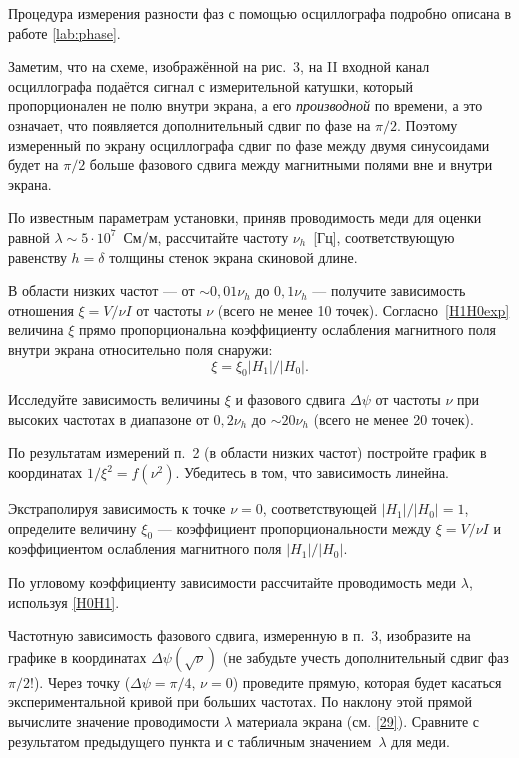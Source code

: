 Процедура измерения разности фаз с помощью осциллографа
подробно описана в работе \ref{lab:phase}.

Заметим, что на схеме, изображённой на рис.~3, на II входной канал
осциллографа подаётся сигнал с измерительной катушки, который пропорционален 
не полю внутри экрана, а его \emph{производной} по времени, а это означает, 
что появляется дополнительный сдвиг по фазе на $\pi/2$. Поэтому измеренный 
по экрану осциллографа сдвиг по фазе между двумя синусоидами будет 
на $\pi/2$ больше фазового сдвига между магнитными полями вне и
внутри экрана. 



\begin{lab:task}
\item По известным параметрам установки, приняв проводимость меди
для оценки равной $\lambda \sim 5\cdot 10^{7}$~См/м, рассчитайте частоту
$\nu_h$~[Гц], соответствующую равенству $h=\delta$ толщины стенок экрана 
скиновой длине.

\item В области низких частот --- от  $\sim 0,01\nu_h$ до $0,1\nu_{h}$ --- получите зависимость отношения $\xi = V/\nu I$ от
частоты $\nu$ (всего не менее 10 точек). Согласно~\eqref{H1H0exp} величина $\xi$ прямо
пропорциональна коэффициенту ослабления магнитного поля внутри 
экрана относительно поля снаружи: 
\[\xi=\xi_0 |H_1|/|H_0|.\]

\item Исследуйте зависимость величины $\xi$ 
и фазового сдвига $\Delta\psi$ от частоты $\nu$ при высоких частотах
в диапазоне от $0,2\nu_h$ до $\sim 20\nu_h$
(всего не менее 20 точек).


\item По результатам измерений п.~2 (в области низких частот)
постройте график в координатах $1/\xi^2=f(\nu^2)$.
Убедитесь в том, что зависимость линейна. 

Экстраполируя зависимость к точке $\nu=0$, соответствующей
$|H_1|/|H_0|=1$, определите величину $\xi_0$ --- коэффициент
пропорциональности между $\xi=V/\nu I$ и коэффициентом ослабления магнитного поля 
$|H_1|/|H_0|$.

По угловому коэффициенту зависимости рассчитайте проводимость меди $\lambda$,
используя \eqref{H0H1}.

\item Частотную зависимость фазового сдвига,
измеренную в п.~3, изобразите на графике в координатах 
$\Delta\psi(\sqrt{\nu})$ (не забудьте учесть дополнительный сдвиг фаз $\pi/2$!). 
Через точку ($\Delta\psi=\pi/4$, $\nu=0$) проведите прямую, 
которая будет касаться экспериментальной кривой при больших частотах. 
По наклону этой прямой вычислите значение проводимости $\lambda$ материала экрана
(см. \eqref{29}). 
Сравните с результатом предыдущего пункта и с табличным значением~$\lambda$ для меди.


\end{lab:task}
